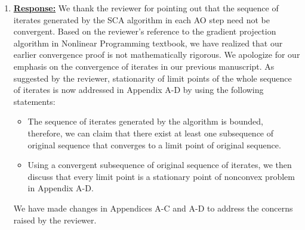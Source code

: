 \begin{enumerate}

\item {}

\vspace{1eM}
\underline{\textbf{Response:}} We thank the reviewer for pointing out that the sequence of iterates generated by the \ac{SCA} algorithm in each \ac{AO} step need not be convergent. Based on the reviewer's reference to the gradient projection algorithm in Nonlinear Programming textbook, we have realized that our earlier convergence proof is not mathematically rigorous. We apologize for our emphasis on the convergence of iterates in our previous manuscript. As suggested by the reviewer, stationarity of limit points of the whole sequence of iterates is now addressed in Appendix A-D by using the following statements: 
\begin{itemize}
	\item The sequence of iterates generated by the algorithm is bounded, therefore, we can claim that there exist at least one subsequence of original sequence that converges to a limit point of original sequence.
	\item Using a convergent subsequence of original sequence of iterates, we then discuss that every limit point is a stationary point of nonconvex problem in Appendix A-D.
\end{itemize}

We have made changes in Appendices A-C and A-D to address the concerns raised by the reviewer.
			

\end{enumerate}
